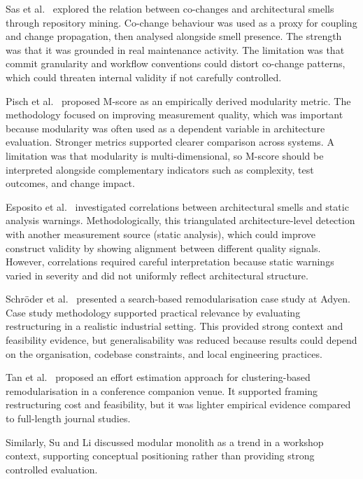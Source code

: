 ﻿\documentclass[conference]{IEEEtran}
\begin{document}
Sas et al.\ \cite{b3} explored the relation between co-changes and architectural smells through repository mining. Co-change behaviour was used as a proxy for coupling and change propagation, then analysed alongside smell presence. The strength was that it was grounded in real maintenance activity. The limitation was that commit granularity and workflow conventions could distort co-change patterns, which could threaten internal validity if not carefully controlled.

Pisch et al.\ \cite{b4} proposed M-score as an empirically derived modularity metric. The methodology focused on improving measurement quality, which was important because modularity was often used as a dependent variable in architecture evaluation. Stronger metrics supported clearer comparison across systems. A limitation was that modularity is multi-dimensional, so M-score should be interpreted alongside complementary indicators such as complexity, test outcomes, and change impact.

Esposito et al.\ \cite{b6} investigated correlations between architectural smells and static analysis warnings. Methodologically, this triangulated architecture-level detection with another measurement source (static analysis), which could improve construct validity by showing alignment between different quality signals. However, correlations required careful interpretation because static warnings varied in severity and did not uniformly reflect architectural structure.

Schr\"oder et al.\ \cite{b7} presented a search-based remodularisation case study at Adyen. Case study methodology supported practical relevance by evaluating restructuring in a realistic industrial setting. This provided strong context and feasibility evidence, but generalisability was reduced because results could depend on the organisation, codebase constraints, and local engineering practices.

Tan et al.\ \cite{b2} proposed an effort estimation approach for clustering-based remodularisation in a conference companion venue. It supported framing restructuring cost and feasibility, but it was lighter empirical evidence compared to full-length journal studies.

Similarly, Su and Li \cite{b5} discussed modular monolith as a trend in a workshop context, supporting conceptual positioning rather than providing strong controlled evaluation.
\end{document}

